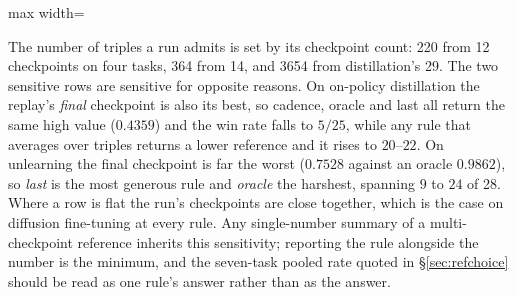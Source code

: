 \begin{table}[t]
\begin{adjustbox}{max width=\linewidth}
\end{adjustbox}
\par\vspace{2pt}
{\footnotesize The number of triples a run admits is set by its checkpoint count: 220 from 12
checkpoints on four tasks, 364 from 14, and 3654 from distillation's 29. The two sensitive rows
are sensitive for opposite reasons. On on-policy distillation the replay's \emph{final}
checkpoint is also its best, so cadence, oracle and last all return the same high value
($0.4359$) and the win rate falls to $5/25$, while any rule that averages over triples returns a
lower reference and it rises to $20$--$22$. On unlearning the final checkpoint is far the worst
($0.7528$ against an oracle $0.9862$), so \emph{last} is the most generous rule and \emph{oracle}
the harshest, spanning $9$ to $24$ of 28. Where a row is flat the run's checkpoints are close
together, which is the case on diffusion fine-tuning at every rule. Any single-number summary of
a multi-checkpoint reference inherits this sensitivity; reporting the rule alongside the number is
the minimum, and the seven-task pooled rate quoted in \S\ref{sec:refchoice} should be read as one
rule's answer rather than as the answer.}
\end{table}
